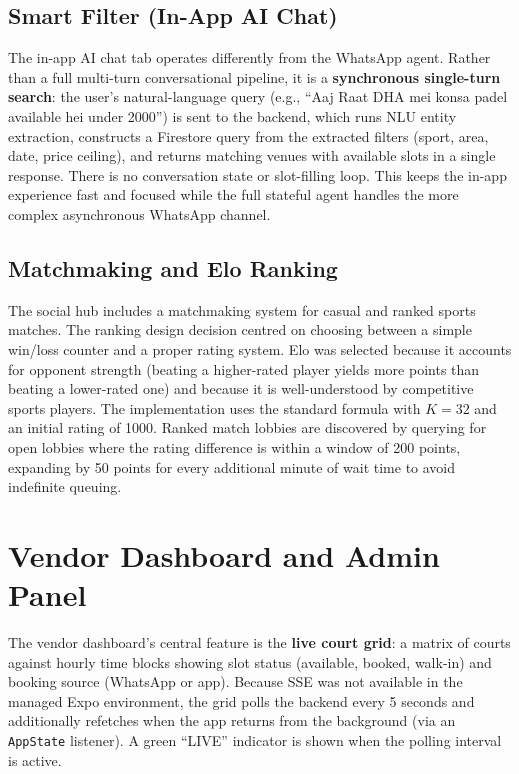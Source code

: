 \subsection{Smart Filter (In-App AI Chat)}

The in-app AI chat tab operates differently from the WhatsApp agent. Rather than a full multi-turn conversational pipeline, it is a \textbf{synchronous single-turn search}: the user's natural-language query (e.g., ``Aaj Raat DHA mei konsa padel available hei under 2000'') is sent to the backend, which runs NLU entity extraction, constructs a Firestore query from the extracted filters (sport, area, date, price ceiling), and returns matching venues with available slots in a single response. There is no conversation state or slot-filling loop. This keeps the in-app experience fast and focused while the full stateful agent handles the more complex asynchronous WhatsApp channel.

\subsection{Matchmaking and Elo Ranking}

The social hub includes a matchmaking system for casual and ranked sports matches. The ranking design decision centred on choosing between a simple win/loss counter and a proper rating system. Elo was selected because it accounts for opponent strength (beating a higher-rated player yields more points than beating a lower-rated one) and because it is well-understood by competitive sports players. The implementation uses the standard formula with $K = 32$ and an initial rating of 1000. Ranked match lobbies are discovered by querying for open lobbies where the rating difference is within a window of 200 points, expanding by 50 points for every additional minute of wait time to avoid indefinite queuing.

\section{Vendor Dashboard and Admin Panel}
\label{sec:dev-vendor}

The vendor dashboard's central feature is the \textbf{live court grid}: a matrix of courts against hourly time blocks showing slot status (available, booked, walk-in) and booking source (WhatsApp or app). Because SSE was not available in the managed Expo environment, the grid polls the backend every 5 seconds and additionally refetches when the app returns from the background (via an \texttt{AppState} listener). A green ``LIVE'' indicator is shown when the polling interval is active.

